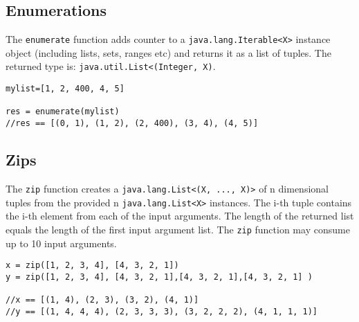 \documentclass[conc-doc]{subfiles}
\begin{document}
\subsection{Enumerations}
The \lstinline{enumerate} function adds counter to a \lstinline{java.lang.Iterable<X>} instance object (including lists, sets, ranges etc) and returns it as a list of tuples. The returned type is: \lstinline{java.util.List<(Integer, X)}.

\begin{lstlisting}
mylist=[1, 2, 400, 4, 5]

res = enumerate(mylist)
//res == [(0, 1), (1, 2), (2, 400), (3, 4), (4, 5)]
\end{lstlisting}

\subsection{Zips}
The \lstinline{zip} function creates a \lstinline{java.lang.List<(X, ..., X)>} of n dimensional tuples from the provided n \lstinline{java.lang.List<X>} instances. The i-th tuple contains the i-th element from each of the input arguments. The length of the returned list equals the length of the first input argument list. The \lstinline{zip} function may consume up to 10 input arguments.

\begin{lstlisting}
x = zip([1, 2, 3, 4], [4, 3, 2, 1])
y = zip([1, 2, 3, 4], [4, 3, 2, 1],[4, 3, 2, 1],[4, 3, 2, 1] )

//x == [(1, 4), (2, 3), (3, 2), (4, 1)]
//y == [(1, 4, 4, 4), (2, 3, 3, 3), (3, 2, 2, 2), (4, 1, 1, 1)]
\end{lstlisting}
\end{document}
